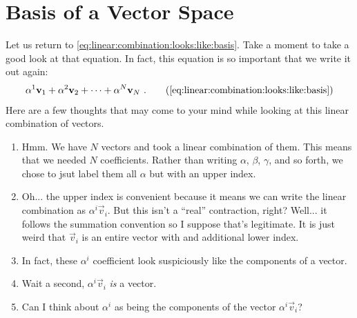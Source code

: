 \section{Basis of a Vector Space}\label{sec:basis}

Let us return to \eqref{eq:linear:combination:looks:like:basis}. Take a moment to take a good look at that equation. In fact, this equation is so important that we write it out again:
\begin{align}
    \alpha^1 \vec{v}_1 + \alpha^2\vec{v}_2 + \cdots + \alpha^N \vec{v}_N \ .
    \tag{\ref{eq:linear:combination:looks:like:basis}}
\end{align}
Here are a few thoughts that may come to your mind while looking at this linear combination of vectors.
\begin{enumerate}
    \item Hmm. We have $N$ vectors and took a linear combination of them. This means that we needed $N$ coefficients. Rather than writing $\alpha$, $\beta$, $\gamma$, and so forth, we chose to jsut label them all $\alpha$ but with an upper index. 
    \item Oh... the upper index is convenient because it means we can write the linear combination as $\alpha^i \vec{v}_i$. But this isn't a ``real'' contraction, right? Well... it follows the summation convention so I suppose that's legitimate. It is just weird that $\vec{v}_i$ is an entire vector with and additional lower index.
    \item In fact, these $\alpha^i$ coefficient look suspiciously like the components of a vector.
    \item Wait a second, $\alpha^i\vec{v}_i$ \emph{is} a vector.
    \item Can I think about $\alpha^i$ as being the components of the vector $\alpha^i\vec{v}_i$?
\end{enumerate}


